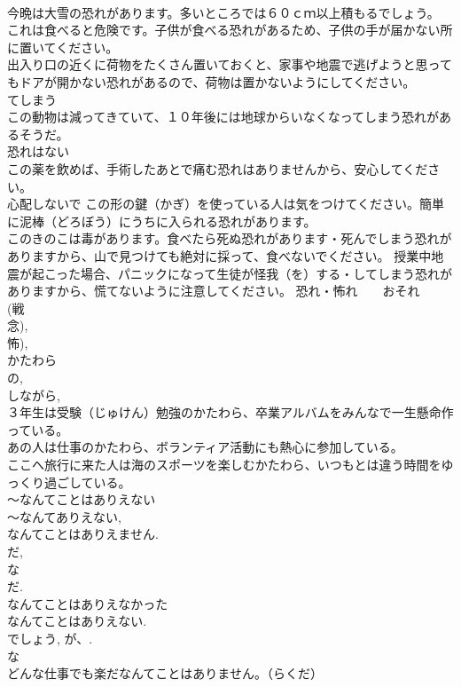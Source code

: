 \documentclass[8pt]{extreport}
\begin{document}
\begin{CJK}{UTF8}{min}
\\	今晩は大雪の恐れがあります。多いところでは６０ｃｍ以上積もるでしょう。 
\\	これは食べると危険です。子供が食べる恐れがあるため、子供の手が届かない所に置いてください。 
\\	出入り口の近くに荷物をたくさん置いておくと、家事や地震で逃げようと思ってもドアが開かない恐れがあるので、荷物は置かないようにしてください。 
\\	てしまう 
\\	この動物は減ってきていて、１０年後には地球からいなくなってしまう恐れがあるそうだ。 
\\	恐れはない 
\\	この薬を飲めば、手術したあとで痛む恐れはありませんから、安心してください。 
\\	心配しないで この形の鍵（かぎ）を使っている人は気をつけてください。簡単に泥棒（どろぼう）にうちに入られる恐れがあります。
\\	このきのこは毒があります。食べたら死ぬ恐れがあります・死んでしまう恐れがありますから、山で見つけても絶対に採って、食べないでください。 授業中地震が起こった場合、パニックになって生徒が怪我（を）する・してしまう恐れがありますから、慌てないように注意してください。 恐れ・怖れ　　おそれ 
\\	(戦
\\	念), 
\\	怖), 
\\	かたわら	
\\	の, 
\\	しながら, 
\\	３年生は受験（じゅけん）勉強のかたわら、卒業アルバムをみんなで一生懸命作っている。 
\\	あの人は仕事のかたわら、ボランティア活動にも熱心に参加している。 
\\	ここへ旅行に来た人は海のスポーツを楽しむかたわら、いつもとは違う時間をゆっくり過ごしている。 
\\	～なんてことはありえない	
\\	～なんてありえない, 
\\	なんてことはありえません. 
\\	だ, 
\\	な
\\	だ. 
\\	なんてことはありえなかった 
\\	なんてことはありえない. 
\\	でしょう, が、. 
\\	な
\\	どんな仕事でも楽だなんてことはありません。（らくだ） 

\end{CJK}
\end{document}
